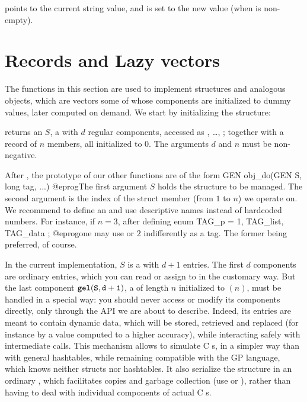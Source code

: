 \item {} points to the current string value, and is set to the new
value (when  is non-empty).

\section{Records and Lazy vectors}
The functions in this section are used to implement  structures and
analogous objects, which are vectors some of whose components are initialized
to dummy values, later computed on demand. We start by initializing the
structure:

 returns an  $S$, a 
with $d$ regular components, accessed as , \dots,
; together with a record of $n$ members, all initialized to
$0$. The arguments $d$ and $n$ must be non-negative.

After , the prototype of our other functions are of
the form
\bprog
  GEN obj_do(GEN S, long tag, ...)
@eprog\noindent The first argument $S$ holds the structure to be managed.
The second argument  is the index of the struct member (from $1$ to
$n$) we operate on. We recommend to define an  and use descriptive
names instead of hardcoded numbers. For instance, if $n = 3$, after defining
\bprog
  enum { TAG_p = 1, TAG_list, TAG_data };
@eprog\noindent one may use  or $2$ indifferently as a tag.
The former being preferred, of course.

In the current implementation, $S$ is a  with $d+1$ entries.
The first $d$ components are ordinary  entries, which you can
read or assign to in the customary way. But the last component ${\tt gel(S,
d+1)}$, a  of length $n$ initialized to $(n)$, must
be handled in a special way: you should never access or modify its components
directly, only through the API we are about to describe. Indeed, its entries
are meant to contain dynamic data, which will be stored, retrieved and
replaced (for instance by a value computed to a higher accuracy), while
interacting safely with intermediate  calls. This mechanism
allows to simulate C s, in a simpler way than with general
hashtables, while remaining compatible with the GP language, which knows
neither structs nor hashtables. It also serialize the structure in an
ordinary , which facilitates copies and garbage collection (use
 or ), rather than having to deal with individual
components of actual C s.


